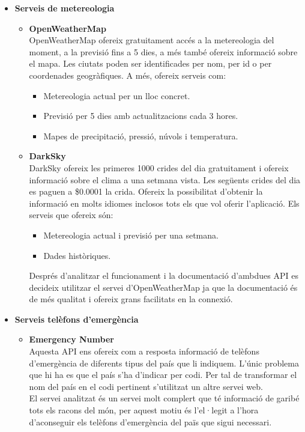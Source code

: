 \begin{itemize}
\item[]\textbf{Serveis de metereologia}
\begin{itemize}
\item{}\textbf{OpenWeatherMap}\\
OpenWeatherMap ofereix gratuitament accés a la metereologia del
moment, a la previsió fins a 5 dies, a més també ofereix informació
sobre el mapa. Les ciutats poden ser identificades per nom, per id o
per coordenades geogràfiques. A més, ofereix serveis com:
\begin{itemize}
\item{}Metereologia actual per un lloc concret.
\item{}Previsió per 5 dies amb actualitzacions cada 3 hores.
\item{}Mapes de precipitació, pressió, núvols i temperatura.
\end{itemize}
\item{}\textbf{DarkSky}\\
DarkSky ofereix les primeres 1000 crides del dia gratuitament i ofereix informació sobre el clima a una setmana vista. Les següents crides del dia es paguen a \$0.0001 la crida. Ofereix la possibilitat d’obtenir la informació en molts idiomes inclosos tots els que vol oferir
l’aplicació. Els serveis que ofereix són:
\begin{itemize}
\item{}Metereologia actual i previsió per una setmana.
\item{}Dades històriques.
\end{itemize}

Després d’analitzar el funcionament i la documentació d’ambdues
API es decideix utilitzar el servei d’OpenWeatherMap ja que la documentació és de més qualitat i ofereix grans facilitats en la connexió.

\end{itemize}

\item[]\textbf{Serveis telèfons d'emergència}
\begin{itemize}
\item{}\textbf{Emergency Number}\\
Aquesta API ens ofereix com a resposta informació de telèfons d’emergència de diferents tipus del país que li indiquem. L’únic problema que hi ha es que el país s’ha d’indicar per codi. Per tal de transformar el nom del país en el codi pertinent s’utilitzat un altre servei web.\\

El servei analitzat és un servei molt complert que té informació de
garibé tots els racons del món, per aquest motiu és l’el·legit a l’hora
d’aconseguir els telèfons d’emergència del païs que sigui necessari.

\end{itemize}
\end{itemize}

